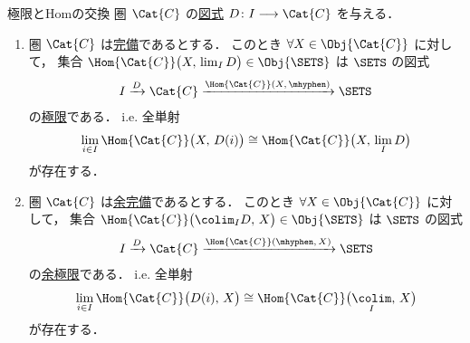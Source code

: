 \documentclass[TQFT_main]{subfiles}
\begin{document}
\begin{myprop}[label=prop:lim-colim-basic,breakable]{極限とHomの交換}
    圏 $\Cat{C}$ の\hyperref[def:diagram]{図式} $D \colon I \lto \Cat{C}$ を与える．
    \begin{enumerate}
        \item 圏 $\Cat{C}$ は\hyperref[def:complete]{完備}であるとする．
        このとき $\forall X \in \Obj{\Cat{C}}$ に対して，
        集合 $\Hom{\Cat{C}} \bigl( X,\, \lim_I D \bigr) \in \Obj{\SETS}$ は $\SETS$ の図式
        \begin{align}
            \label{eq:diag-post}
            I \xrightarrow{D} \Cat{C} \xrightarrow{\Hom{\Cat{C}}(X,\, \mhyphen)} \SETS
        \end{align}
        の\hyperref[def:lim]{極限}である．
        i.e. 全単射
        \begin{align}
            \lim_{i \in I} \Hom{\Cat{C}} \bigl( X,\, D(i) \bigr) \cong \Hom{\Cat{C}} \bigl( X,\, \lim_I D \bigr) 
        \end{align}
        が存在する．
        \item  圏 $\Cat{C}$ は\hyperref[def:complete]{余完備}であるとする．
        このとき $\forall X \in \Obj{\Cat{C}}$ に対して，
        集合 $\Hom{\Cat{C}} \bigl( \colim_I D,\, X \bigr) \in \Obj{\SETS}$ は $\SETS$ の図式
        \begin{align}
            \label{eq:diag-pre}
            I \xrightarrow{D} \Cat{C} \xrightarrow{\Hom{\Cat{C}}(\mhyphen,\, X)} \SETS
        \end{align}
        の\hyperref[def:colim]{余極限}である．
        i.e. 全単射
        \begin{align}
            \lim_{i \in I} \Hom{\Cat{C}} \bigl( D(i),\, X\bigr) \cong \Hom{\Cat{C}} \bigl(\underset{I}{\colim},\, X \bigr) 
        \end{align}
        が存在する．
    \end{enumerate}
\end{myprop}
\end{document}
